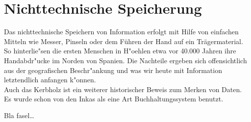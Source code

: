 
\chapter{Nichttechnische Speicherung}
\label{ch:Nichttechnische Speicherung}
Das nichttechnische Speichern von Information erfolgt mit Hilfe von einfachen Mitteln wie Messer, Pinseln oder dem Führen der Hand auf ein Trägermaterial. So hinterlie"sen die ersten Menschen in H"oehlen etwa vor 40.000 Jahren ihre Handabdr"ucke im Norden von Spanien\cite{spiegel:hoehle}. Die Nachteile ergeben sich offensichtlich aus der geografischen Beschr"ankung und was wir heute mit Information letztendlich anfangen k"onnen.
\\
Auch das Kerbholz ist ein weiterer historischer Beweis zum Merken von Daten. Es wurde schon von den Inkas als eine Art Buchhaltungssystem benutzt.


Bla fasel\ldots


